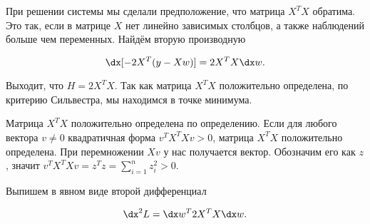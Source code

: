 \begin{sol}
При решении системы мы сделали предположение, что матрица $X^TX$ обратима. Это так, если в матрице $X$ нет линейно зависимых столбцов, а также наблюдений больше чем переменных. Найдём вторую производную 

\[
\dx[-2X^T(y-Xw)] = 2X^TX \dx w.
\]

Выходит, что $H = 2X^TX$. Так как матрица $X^TX$ положительно определена, по критерию Сильвестра, мы находимся в точке минимума. 

Матрица $X^TX$ положительно определена по определению. Если для любого вектора $v \ne 0$ квадратичная форма $v^T X^TX v > 0$, матрица  $X^TX$ положительно определена. При перемножении $Xv$ у нас получается вектор. Обозначим его как $z$, значит $v^T X^TX v = z^T z = \sum_{i=1}^n z_i^2 > 0$. 

Выпишем в явном виде второй дифференциал 

\[
\dx^2 L = \dx w^T 2X^TX \dx w.
\]
\end{sol} 

